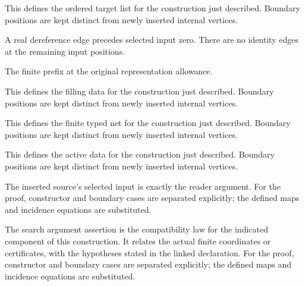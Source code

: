 This defines the ordered target list for the construction just described. Boundary positions are kept distinct from newly inserted internal vertices.
\par{}

A real dereference edge precedes selected input zero. There are no identity edges at the remaining input positions.
\par{}

The finite prefix at the original representation allowance.
\par{}

This defines the filling data for the construction just described. Boundary positions are kept distinct from newly inserted internal vertices.
\par{}

This defines the finite typed net for the construction just described. Boundary positions are kept distinct from newly inserted internal vertices.
\par{}

This defines the active data for the construction just described. Boundary positions are kept distinct from newly inserted internal vertices.
\par{}

The inserted source's selected input is exactly the reader argument.
For the proof, constructor and boundary cases are separated explicitly; the defined maps and incidence equations are substituted.
\par{}

The search argument assertion is the compatibility law for the indicated component of this construction. It relates the actual finite coordinates or certificates, with the hypotheses stated in the linked declaration.
For the proof, constructor and boundary cases are separated explicitly; the defined maps and incidence equations are substituted.
\par{}

